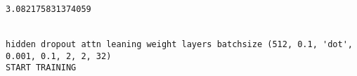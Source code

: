 \documentclass[11pt]{article}
\begin{document}
    \begin{center}
    \end{center}
    { \hspace*{\fill} \\}
    
    \begin{center}
    \end{center}
    { \hspace*{\fill} \\}
    
    \begin{Verbatim}[commandchars=\\\{\}]
3.082175831374059


hidden dropout attn leaning weight layers batchsize (512, 0.1, 'dot', 0.001, 0.1, 2, 2, 32)
START TRAINING



    \end{Verbatim}

    \begin{center}
    \end{center}
    { \hspace*{\fill} \\}
    
    \begin{center}
    \end{center}
    { \hspace*{\fill} \\}
    
    \begin{center}
    \end{center}
    { \hspace*{\fill} \\}
    
    \begin{center}
    \end{center}
    { \hspace*{\fill} \\}
    
    \begin{center}
    \end{center}
    { \hspace*{\fill} \\}
    
\end{document}
